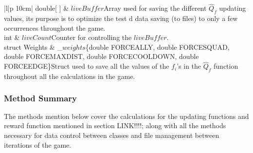 \begin{centering}
\begin{table}
\begin{tabular}{|l|p {10cm}|}
 	\hline
 	double[ ] &  $liveBuffer$\linebreak  Array used for saving the different $\hat{Q}_f$ updating values, its purpose is to optimize the test d data saving (to files) to only a few occurrences throughout the game. \\
 	\hline
 	int &  $liveCount$\linebreak  Counter for controlling the $liveBuffer$.\\
 	\hline
 	struct Weights & \_$weights$\{double FORCEALLY, double FORCESQUAD, double FORCEMAXDIST, double FORCECOOLDOWN, double FORCEEDGE\}\linebreak  Struct used to save all the values of the $f_i$'s in the $\hat{Q}_f$ function throughout all the calculations in the game. \\
 	\hline
\end{tabular}
\end{table}
\end{centering}

\pagebreak
\subsubsection{Method Summary}

The methods mention below cover the calculations for the updating functions and reward function mentioned in section LINK!!!!; along with all the methods necessary for data control between classes and file management between iterations of the game. 


